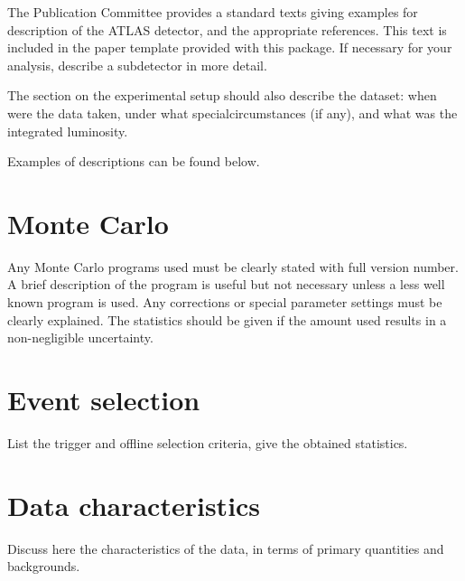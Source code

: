 \documentclass[UKenglish]{style/atlasdoc}
\begin{document}
The Publication Committee provides a standard texts giving examples
for description of the ATLAS detector, and the appropriate references.
This text is included in the paper template provided with this package.
If necessary for your analysis, describe a subdetector in more detail.

The section on the experimental setup should also describe the dataset:
when were the data taken, under what specialcircumstances (if any),
and what was the integrated luminosity.

Examples of descriptions can be found below.




\section{Monte Carlo}
\label{sec:MC}

Any Monte Carlo programs used must be clearly stated with full version
number. A brief description of the program is useful but not necessary
unless a less well known program is used.  Any corrections or special
parameter settings must be clearly explained.  The statistics should
be given if the amount used results in a non-negligible uncertainty.


\section{Event selection}
\label{sec:selection}

List the trigger and offline selection criteria, give the obtained
statistics.


\section{Data characteristics}
\label{sec:control}

Discuss here the characteristics of the data, in terms of
primary quantities and backgrounds.


\end{document}
